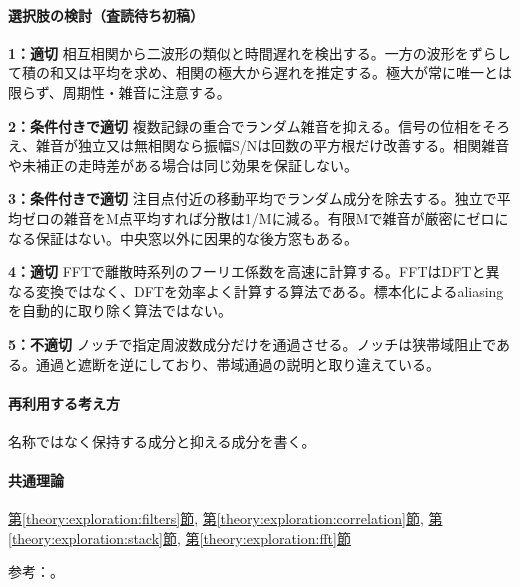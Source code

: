 \paragraph{選択肢の検討（査読待ち初稿）}\mbox{}\par

\noindent\textbf{1：適切} 相互相関から二波形の類似と時間遅れを検出する。一方の波形をずらして積の和又は平均を求め、相関の極大から遅れを推定する。極大が常に唯一とは限らず、周期性・雑音に注意する。\par

\noindent\textbf{2：条件付きで適切} 複数記録の重合でランダム雑音を抑える。信号の位相をそろえ、雑音が独立又は無相関なら振幅S/Nは回数の平方根だけ改善する。相関雑音や未補正の走時差がある場合は同じ効果を保証しない。\par

\noindent\textbf{3：条件付きで適切} 注目点付近の移動平均でランダム成分を除去する。独立で平均ゼロの雑音をM点平均すれば分散は1/Mに減る。有限Mで雑音が厳密にゼロになる保証はない。中央窓以外に因果的な後方窓もある。\par

\noindent\textbf{4：適切} FFTで離散時系列のフーリエ係数を高速に計算する。FFTはDFTと異なる変換ではなく、DFTを効率よく計算する算法である。標本化によるaliasingを自動的に取り除く算法ではない。\par

\noindent\textbf{5：不適切} ノッチで指定周波数成分だけを通過させる。ノッチは狭帯域阻止である。通過と遮断を逆にしており、帯域通過の説明と取り違えている。\par

\paragraph{再利用する考え方} 名称ではなく保持する成分と抑える成分を書く。

\paragraph{共通理論} \hyperref[theory:exploration:filters]{第\ref*{theory:exploration:filters}節}, \hyperref[theory:exploration:correlation]{第\ref*{theory:exploration:correlation}節}, \hyperref[theory:exploration:stack]{第\ref*{theory:exploration:stack}節}, \hyperref[theory:exploration:fft]{第\ref*{theory:exploration:fft}節}

\par 参考：\cite{mit_signals2010,mit_moving2012,scipy_notch,scipy_fft,usgs_processing2000}。

